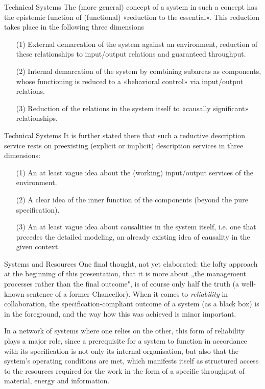 \documentclass{beamer}
\begin{document}
\begin{frame}{Technical Systems}
The (more general) concept of a system in such a concept has the epistemic
function of (functional) «reduction to the essential». This reduction takes
place in the following three dimensions
\begin{itemize}
\item [(1)] External demarcation of the system against an environment,
  reduction of these relationships to input/output relations and guaranteed
  throughput.
\item [(2)] Internal demarcation of the system by combining subareas as
  components, whose functioning is reduced to a «behavioral control» via
  input/output relations.
\item [(3)] Reduction of the relations in the system itself to «causally
  significant» relationships.
\end{itemize}
\end{frame}

\begin{frame}{Technical Systems}
It is further stated there that such a reductive description service rests on
preexisting (explicit or implicit) description services in three dimensions:
\begin{itemize}
\item [(1)] An at least vague idea about the (working) input/output services of
  the environment.
\item [(2)] A clear idea of the inner function of the components (beyond the
  pure specification).
\item [(3)] An at least vague idea about causalities in the system itself,
  i.e. one that precedes the detailed modeling, an already existing idea of
  causality in the given context.
\end{itemize}
\end{frame}
\begin{frame}{Systems and Resources}\small
One final thought, not yet elaborated: the lofty approach at the beginning of
this presentation, that it is more about „the management processes rather than
the final outcome", is of course only half the truth (a well-known sentence of
a former Chancellor).  When it comes to \emph{reliability} in collaboration,
the specification-compliant outcome of a system (as a black box) is in the
foreground, and the way how this was achieved is minor important.

In a network of systems where one relies on the other, this form of
reliability plays a major role, since a prerequisite for a system to function
in accordance with its specification is not only its internal organisation,
but also that the system's operating conditions are met, which manifests
itself as structured access to the resources required for the work in the form
of a specific throughput of material, energy and information.
  
  
\end{frame}
\end{document}
